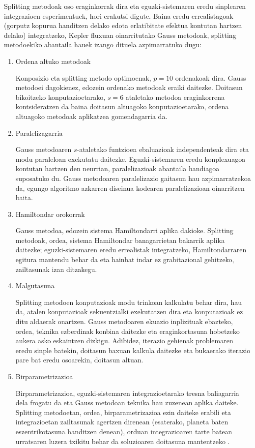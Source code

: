 Splitting metodoak oso eraginkorrak dira eta eguzki-sistemaren eredu sinplearen integrazioen  esperimentuek, hori erakutsi digute. Baina eredu errealistagoak (gorputz kopurua handitzen delako edota erlatibitate efektua kontutan hartzen delako) integratzeko, Kepler fluxuan oinarritutako Gauss metodoak, splitting metodoekiko abantaila hauek izango dituela azpimarratuko dugu:  

\begin{enumerate}

\item Ordena altuko metodoak

Konposizio eta  splitting metodo optimoenak, $p=10$ ordenakoak dira. Gauss metodoei dagokienez, edozein ordenako metodoak eraiki daitezke. Doitasun bikoitzeko konputazioetarako, $s=6$ ataletako metodoa eraginkorrena kontsideratzen da \cite{Hairer2008} baina doitasun altuagoko konputazioetarako, ordena altuagoko metodoak aplikatzea gomendagarria da.

\item Paralelizagarria

Gauss metodoaren $s$-ataletako funtzioen ebaluazioak independenteak dira eta modu paraleloan exekutatu daitezke. Eguzki-sistemaren eredu konplexuagoa kontutan hartzen den neurrian, paralelizazioak abantaila handiagoa suposatuko du. Gauss metodoaren paralelizazio gaitasun hau azpimarratzekoa da, egungo algoritmo azkarren diseinua kodearen paralelizazioan oinarritzen baita.

\item Hamiltondar orokorrak

Gauss metodoa, edozein sistema Hamiltondarri aplika dakioke. Splitting metodoak, ordea, sistema Hamiltondar banagarrietan bakarrik aplika daitezke; eguzki-sistemaren eredu errealistak integratzeko, Hamiltondarraren egitura mantendu behar da eta hainbat indar ez grabitazional  gehitzeko, zailtasunak izan ditzakegu. 

\item Malgutasuna

Splitting metodoen konputazioak modu trinkoan kalkulatu behar dira, hau da, atalen konputazioak sekuentzialki exekutatzen dira eta konputazioak ez ditu aldaerak onartzen. Gauss metodoaren ekuazio inplizituak ebazteko, ordea, teknika ezberdinak konbina daitezke eta eraginkortasuna hobetzeko aukera asko eskaintzen dizkigu. Adibidez, iterazio gehienak problemaren eredu sinple batekin, doitasun baxuan kalkula daitezke  \cite{Beylkin2014} eta bukaerako iterazio pare bat eredu osoarekin, doitasun altuan. 

\item Birparametrizazioa

Birparametrizazioa, eguzki-sistemaren integrazioetarako tresna baliagarria dela frogatu da \cite{Fukushima2007,Rauch1998} eta Gauss metodoan teknika hau zuzenean aplika daiteke. Splitting metodoetan, ordea, birparametrizazioa ezin daiteke erabili eta integrazioetan zailtasunak agertzen direnean (esaterako, planeta baten eszentrikotasuna handitzen denean), orduan integrazioaren tarte batean urratsaren luzera txikitu behar da soluzioaren doitasuna mantentzeko \cite{Laskar2009}.

\end{enumerate}


